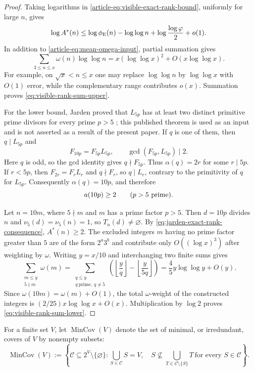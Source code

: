 \begin{proof}
Taking logarithms in \eqref{article-eq:visible-exact-rank-bound}, uniformly for
large $n$, gives
\[
 \log A^*(n)\leq
 \log\phi_{\rm E}(n)-\log\log n
 +\log\frac{\log\varphi}{2}+o(1).
\]
In addition to \eqref{article-eq:mean-omega-input}, partial summation gives
\[
 \sum_{3\leq n\leq x}\omega(n)\log\log n
 =x(\log\log x)^2+O(x\log\log x).
\]
For example, on $\sqrt x<n\leq x$ one may replace $\log\log n$ by
$\log\log x$ with $O(1)$ error, while the complementary range contributes
$o(x)$. Summation proves \eqref{eq:visible-rank-sum-upper}.

For the lower bound, Jarden proved that $L_{5p}$ has at least two distinct
primitive prime divisors for every prime $p>5$
\cite{Jarden1968LucasTwoPrimitive}; this published theorem is used as an
input and is not asserted as a result of the present paper. If $q$ is one of
them, then
$q\mid L_{5p}$ and
\[
 F_{10p}=F_{5p}L_{5p},\qquad \gcd(F_{5p},L_{5p})\mid2.
\]
Here $q$ is odd, so the gcd identity gives $q\nmid F_{5p}$. Thus
$\alpha(q)=2r$ for some $r\mid5p$. If $r<5p$, then
$F_{2r}=F_rL_r$ and $q\nmid F_r$, so $q\mid L_r$, contrary to the
primitivity of $q$ for $L_{5p}$.
Consequently $\alpha(q)=10p$, and therefore
\begin{equation}\label{eq:jarden-exact-rank-consequence}
 a(10p)\geq2\qquad(p>5\ \hbox{prime}).
\end{equation}

Let $n=10m$, where $5\nmid m$ and $m$ has a prime factor $p>5$. Then
$d=10p$ divides $n$ and
$\nu_5(d)=\nu_5(n)=1$, so $T_n(d)\ne\varnothing$. By
\eqref{eq:jarden-exact-rank-consequence}, $A^*(n)\geq2$. The excluded
integers $m$ having no prime factor greater than $5$ are of the form
$2^a3^b$ and contribute only $O((\log x)^3)$ after weighting by $\omega$.
Writing $y=x/10$ and interchanging two finite sums gives
\[
 \sum_{\substack{m\leq y\\5\nmid m}}\omega(m)
 =\sum_{\substack{q\leq y\\q\ \mathrm{prime},\ q\ne5}}
 \left(\left\lfloor\frac yq\right\rfloor
 -\left\lfloor\frac y{5q}\right\rfloor\right)
 =\frac45y\log\log y+O(y).
\]
Since $\omega(10m)=\omega(m)+O(1)$, the total $\omega$-weight of the
constructed integers is
$(2/25)x\log\log x+O(x)$. Multiplication by $\log2$ proves
\eqref{eq:visible-rank-sum-lower}.
\end{proof}


For a finite set $V$, let $\operatorname{MinCov}(V)$ denote the set of
minimal, or irredundant, covers of $V$ by nonempty subsets:
\[
 \operatorname{MinCov}(V):=
 \left\{\mathcal C\subseteq 2^V\setminus\{\varnothing\}:
 \bigcup_{S\in\mathcal C}S=V,\quad
 S\nsubseteq\bigcup_{T\in\mathcal C\setminus\{S\}}T
 \ \text{for every }S\in\mathcal C\right\}.
\]


